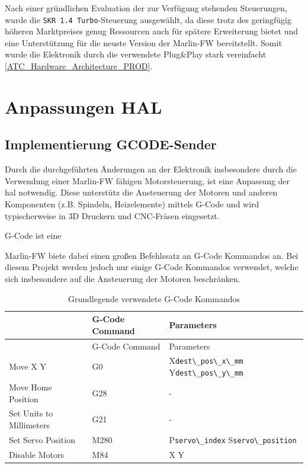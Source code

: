 Nach einer gründlichen Evaluation der zur Verfügung stehenden
Steuerungen, wurde die \passthrough{\lstinline!SKR 1.4 Turbo!}-Steuerung
ausgewählt, da diese trotz des geringfügig höheren Marktpreises genug
Ressourcen auch für spätere Erweiterung bietet und eine Unterstützung
für die neuste Version der Marlin-FW\cite{marlinfw} bereitstellt.
Somit wurde die Elektronik durch die verwendete Plug\&Play stark
vereinfacht \ref{ATC_Hardware_Architecture_PROD}.

\hypertarget{anpassungen-hal}{%
\section{Anpassungen HAL}\label{anpassungen-hal}}

\hypertarget{implementierung-gcode-sender}{%
\subsection{Implementierung
GCODE-Sender}\label{implementierung-gcode-sender}}

Durch die durchgeführten Änderungen an der Elektronik insbesondere durch
die Verwendung einer Marlin-FW\cite{marlinfw} fähigen
Motorsteuerung, ist eine Anpassung der \gls{hal} notwendig. Diese
unterstütz die Ansteuerung der Motoren und anderen Komponenten (z.B.
Spindeln, Heizelemente) mittels G-Code und wird typischerweise in 3D
Druckern und CNC-Fräsen eingesetzt.

G-Code ist eine

Marlin-FW\cite{marlinfw} biete dabei einen großen Befehlssatz an
G-Code Kommandos an. Bei diesem Projekt werden jedoch nur einige G-Code
Kommandos verwendet, welche sich insbesondere auf die Ansteuerung der
Motoren beschränken.

\begin{longtable}[]{@{}lll@{}}
\caption{Grundlegende verwendete G-Code Kommandos}\tabularnewline
\toprule
& G-Code Command & Parameters\tabularnewline
\midrule
\endfirsthead
\toprule
& G-Code Command & Parameters\tabularnewline
\midrule
\endhead
Move X Y & G0 & X\passthrough{\lstinline!dest\_pos\_x\_mm!}
Y\passthrough{\lstinline!dest\_pos\_y\_mm!}\tabularnewline
Move Home Position & G28 & -\tabularnewline
Set Units to Millimeters & G21 & -\tabularnewline
Set Servo Position & M280 & P\passthrough{\lstinline!servo\_index!}
S\passthrough{\lstinline!servo\_position!}\tabularnewline
Disable Motors & M84 & X Y\tabularnewline
\bottomrule
\end{longtable}

